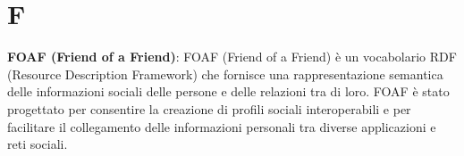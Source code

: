 \section{F}
\textbf{FOAF (Friend of a Friend)}: FOAF (Friend of a Friend) è un vocabolario RDF (Resource Description Framework) che fornisce una rappresentazione semantica delle informazioni sociali delle persone e delle relazioni tra di loro. FOAF è stato progettato per consentire la creazione di profili sociali interoperabili e per facilitare il collegamento delle informazioni personali tra diverse applicazioni e reti sociali.